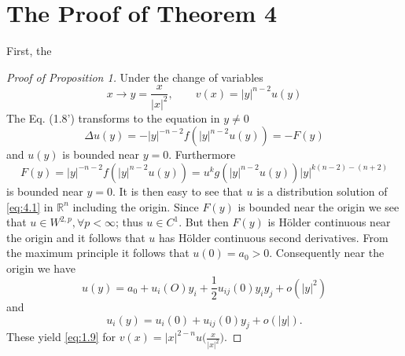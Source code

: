 \section{The Proof of Theorem 4}
First, the
\begin{proof}[Proof of Proposition 1]
	Under the change of variables
	\[x\rightarrow y=\frac{x}{|x|^2},\qquad v(x)=|y|^{n-2}u(y)\]
	The Eq. (1.8') transforms to the equation in $y\neq0$
	\begin{equation}\label{eq:4.1}
		\Delta u(y) = - |y|^{-n-2} f(|y|^{n-2}u(y)) = - F(y)
	\end{equation}
	and $u(y)$ is bounded near $y = 0$. Furthermore
	\[ F(y) = |y|^{-n-2} f(|y|^{n-2}u(y)) = u^k g(|y|^{n-2}u(y))|y|^{k(n-2)-(n + 2)} \]
	is bounded near $y=0$. It is then easy to see that $u$ is a distribution solution
  of \eqref{eq:4.1} in $\mathbb{R}^n$ including the origin. Since $F(y)$ 
  is bounded near the origin we see that $u\in W^{2,p}, \forall p < \infty$;
  thus $u\in C^1$. But then $F(y)$ is H\"older continuous near the origin and it follows 
  that $u$ has H\"older continuous second derivatives. From the maximum principle 
  it follows that $u(0)= a_0 > 0$. Consequently near the origin we have
	\[u(y) = a_0 + u_i(O)y_i + \frac12 u_{ij}(0)y_iy_j + o(|y|^2)\]
	and
	\[u_i(y) = u_i(0) + u_{ij}(0)y_j + o(|y|).\]
	These yield \eqref{eq:1.9} for $v(x)=|x|^{2-n}u\bigl(\frac{x}{|x|^2}\bigr)$.
\end{proof}


